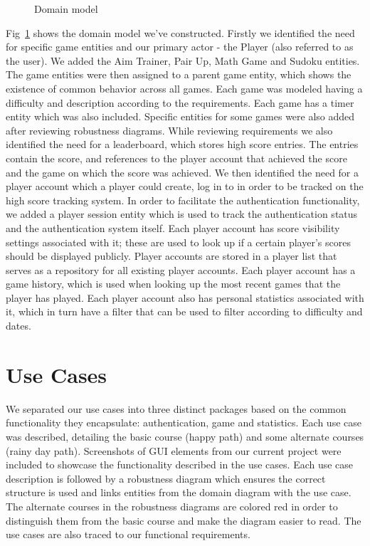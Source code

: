 \documentclass[11pt,a4paper]{article}
\newcommand{\inputdiagram}[1]{}
\newcommand{\textwidthdiagram}[2][1]{%
  \resizebox{#1\textwidth}{!}{\inputdiagram{PSI_3rd_trial/#2}}%
}
\begin{document}
\begin{figure}[H]
    \centering
    \textwidthdiagram{domain_model.tex}
    \caption{Domain model}
    \label{fig:domain_model}
\end{figure}

Fig~\ref{fig:domain_model} shows the domain model we've constructed. Firstly we identified the need for specific game entities and our primary actor - the Player (also referred to as the user). We added the Aim Trainer, Pair Up, Math Game and Sudoku entities. The game entities were then assigned to a parent game entity, which shows the existence of common behavior across all games. Each game was modeled having a difficulty and description according to the requirements. Each game has a timer entity which was also included. Specific entities for some games were also added after reviewing robustness diagrams. While reviewing requirements we also identified the need for a leaderboard, which stores high score entries. The entries contain the score, and references to the player account that achieved the score and the game on which the score was achieved. We then identified the need for a player account which a player could create, log in to in order to be tracked on the high score tracking system. In order to facilitate the authentication functionality, we added a player session entity which is used to track the authentication status and the authentication system itself. Each player account has score visibility settings associated with it; these are used to look up if a certain player's scores should be displayed publicly. Player accounts are stored in a player list that serves as a repository for all existing player accounts. Each player account has a game history, which is used when looking up the most recent games that the player has played. Each player account also has personal statistics associated with it, which in turn have a filter that can be used to filter according to difficulty and dates.

\section{Use Cases}

We separated our use cases into three distinct packages based on the common functionality they encapsulate: authentication, game and statistics. Each use case was described, detailing the basic course (happy path) and some alternate courses (rainy day path). Screenshots of GUI elements from our current project were included to showcase the functionality described in the use cases. Each use case description is followed by a robustness diagram which ensures the correct structure is used and links entities from the domain diagram with the use case. The alternate courses in the robustness diagrams are colored red in order to distinguish them from the basic course and make the diagram easier to read. The use cases are also traced to our functional requirements.
\end{document}
